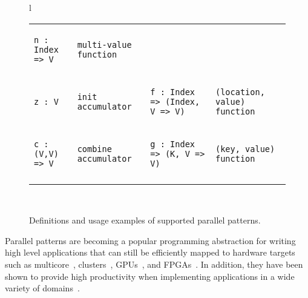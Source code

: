 \documentclass[pageno]{jpaper}
\begin{document}
\begin{figure*}
\begin{tabular}{l}
{\begin{tabular*}{0.95\textwidth}{llll}
{\begin{lstlisting}[numbers=none,mathescape=true]
n : Index => V
\end{lstlisting}} &

{\begin{lstlisting}[numbers=none,mathescape=true]
multi-value function
\end{lstlisting}} \\

{\begin{lstlisting}[numbers=none,mathescape=true]
z : V
\end{lstlisting}} &

{\begin{lstlisting}[numbers=none,mathescape=true]
init accumulator
\end{lstlisting}} &

{\begin{lstlisting}[numbers=none,mathescape=true]
f : Index => (Index, V => V)
\end{lstlisting}} &

{\begin{lstlisting}[numbers=none,mathescape=true]
(location, value) function
\end{lstlisting}} \\

{\begin{lstlisting}[numbers=none,mathescape=true]
c : (V,V) => V
\end{lstlisting}} &

{\begin{lstlisting}[numbers=none,mathescape=true]
combine accumulator
\end{lstlisting}} \hspace{51pt} &

{\begin{lstlisting}[numbers=none,mathescape=true]
g : Index => (K, V => V)
\end{lstlisting}} &

{\begin{lstlisting}[numbers=none,mathescape=true]
(key, value) function
\end{lstlisting}} \\
\noalign{\hrule height 1.5pt}

\end{tabular*}}
\\
\end{tabular}
\caption{\label{fig:ppl-syntax}Definitions and usage examples of supported parallel patterns.}
\end{figure*} Parallel patterns are becoming a popular programming abstraction for writing high level applications that can still be efficiently mapped to hardware targets such as multicore~\cite{scala,haskell,delite-tecs14}, clusters~\cite{mapreduce,zaharia10spark,spartan}, GPUs~\cite{catanzaro11copperhead,micro14lee}, and FPGAs~\cite{auerbach10lime,george14fpl}. In addition, they have been shown to provide high productivity when implementing applications in a wide variety of domains~\cite{ecoop13sujeeth,pldi13halide}.
\end{document}
